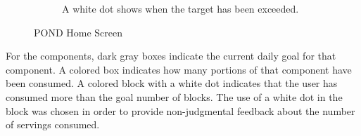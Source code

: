 \begin{figure}
\begin{subfigure}[t]{1.25in}
	\end{subfigure}
\quad
\begin{subfigure}[t]{1.25in}
		\centering
		\setlength\fboxsep{0pt}
\setlength\fboxrule{0.5pt}
		\caption{A white dot shows when the target has been exceeded. }\label{fig:pond_overview_d}
	\end{subfigure}

	\caption{POND Home Screen}\label{fig:POND_overview}
\end{figure}


For the components, dark gray boxes indicate the current daily goal for that component. A colored box indicates how many portions of that component have been consumed. A colored block with a white dot indicates that the user has consumed more than the goal number of blocks. The use of a white dot in the block was chosen in order to provide non-judgmental feedback about the number of servings consumed. 


